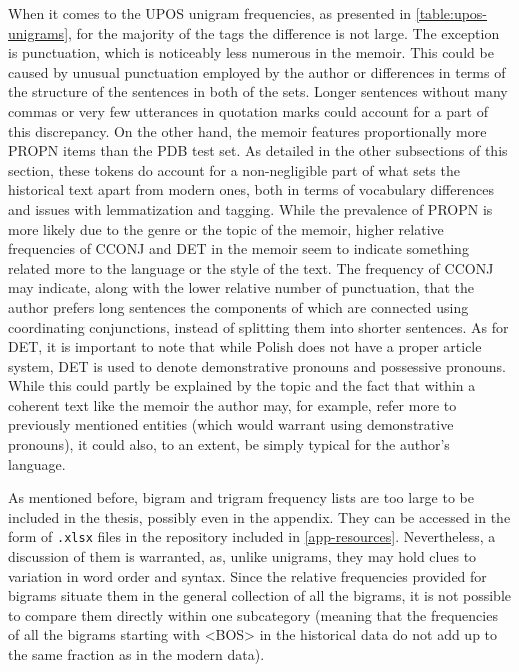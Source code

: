 When it comes to the UPOS unigram frequencies, as presented in \autoref{table:upos-unigrams}, for the majority of the tags the difference is not large. The exception is punctuation, which is noticeably less numerous in the memoir. This could be caused by unusual punctuation employed by the author or differences in terms of the structure of the sentences in both of the sets. Longer sentences without many commas or very few utterances in quotation marks could account for a part of this discrepancy. On the other hand, the memoir features proportionally more PROPN items than the PDB test set. As detailed in the other subsections of this section, these tokens do account for a non-negligible part of what sets the historical text apart from modern ones, both in terms of vocabulary differences and issues with lemmatization and tagging. While the prevalence of PROPN is more likely due to the genre or the topic of the memoir, higher relative frequencies of CCONJ and DET in the memoir seem to indicate something related more to the language or the style of the text. The frequency of CCONJ may indicate, along with the lower relative number of punctuation, that the author prefers long sentences the components of which are connected using coordinating conjunctions, instead of splitting them into shorter sentences. As for DET, it is important to note that while Polish does not have a proper article system, DET is used to denote demonstrative pronouns and possessive pronouns. While this could partly be explained by the topic and the fact that within a coherent text like the memoir the author may, for example, refer more to previously mentioned entities (which would warrant using demonstrative pronouns), it could also, to an extent, be simply typical for the author's language.

As mentioned before, bigram and trigram frequency lists are too large to be included in the thesis, possibly even in the appendix. They can be accessed in the form of \texttt{.xlsx} files in the repository included in \autoref{app-resources}. Nevertheless, a discussion of them is warranted, as, unlike unigrams, they may hold clues to variation in word order and syntax. Since the relative frequencies provided for bigrams situate them in the general collection of all the bigrams, it is not possible to compare them directly within one subcategory (meaning that the frequencies of all the bigrams starting with <BOS> in the historical data do not add up to the same fraction as in the modern data).

